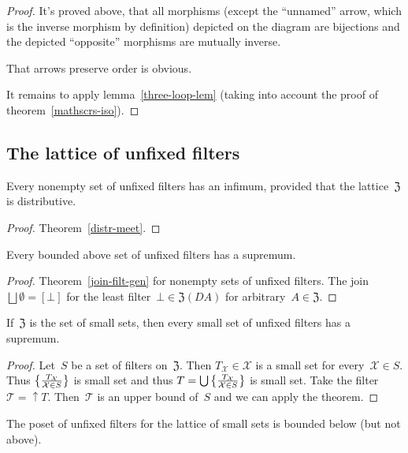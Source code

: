 \begin{proof}
It's proved above, that all morphisms (except the ``unnamed'' arrow,
which is the inverse morphism by definition) depicted on the diagram
are bijections and the depicted ``opposite'' morphisms are mutually
inverse.

That arrows preserve order is obvious.

It remains to apply lemma~\ref{three-loop-lem} (taking into account the proof of theorem~\ref{mathscrs-iso}).
\end{proof}

\subsection{The lattice of unfixed filters}

\begin{thm}
Every nonempty set of unfixed filters has an infimum,
provided that the lattice~$\mathfrak{Z}$ is distributive.
\end{thm}

\begin{proof}
Theorem~\ref{distr-meet}.
\end{proof}

\begin{thm}
Every bounded above set of unfixed filters has a supremum.
\end{thm}

\begin{proof}
Theorem~\ref{join-filt-gen} for nonempty sets of unfixed
filters. The join $\bigsqcup\emptyset=[\bot]$ for the
least filter~$\bot\in\mathfrak{Z}(DA)$ for
arbitrary~$A\in\mathfrak{Z}$.
\end{proof}

\begin{cor}
If~$\mathfrak{Z}$ is the set of small sets, then
every small set of unfixed filters has a supremum.
\end{cor}

\begin{proof}
Let~$S$ be a set of filters on~$\mathfrak{Z}$. Then $T_{\mathcal{X}}\in\mathcal{X}$ is a small set
for every~$\mathcal{X}\in S$.
Thus
$\left\{ \frac{T_{\mathcal{X}}}{\mathcal{X}\in S}\right\}$ is small
set and thus
$T=\bigcup\left\{ \frac{T_{\mathcal{X}}}{\mathcal{X}\in S}\right\}$ is small set. Take the filter $\mathcal{T}=\uparrow T$.
Then~$\mathcal{T}$ is an upper bound of~$S$ and we can apply the theorem.
\end{proof}

\begin{obvious}
The poset of unfixed filters for the lattice of small sets
is bounded below (but not above).
\end{obvious}

